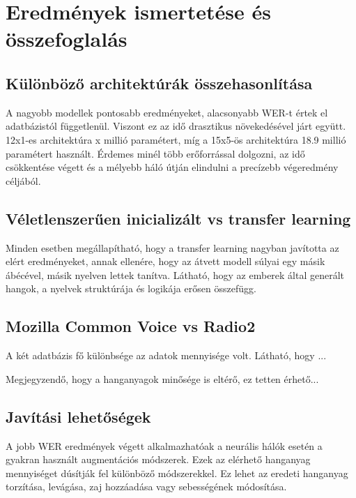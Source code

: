\chapter{Eredmények ismertetése és összefoglalás}

\section{Különböző architektúrák összehasonlítása}

A nagyobb modellek pontosabb eredményeket, alacsonyabb WER-t értek el adatbázistól függetlenül. Viszont ez az idő drasztikus növekedésével járt együtt. 12x1-es architektúra x millió paramétert, míg a 15x5-ös architektúra 18.9 millió paramétert használt. Érdemes minél több erőforrással dolgozni, az idő csökkentése végett és a mélyebb háló útján elindulni a precízebb végeredmény céljából.


\section{Véletlenszerűen inicializált vs transfer learning}

Minden esetben megállapítható, hogy a transfer learning nagyban javította az elért eredményeket, annak ellenére, hogy az átvett modell súlyai egy másik ábécével, másik nyelven lettek tanítva. Látható, hogy az emberek által generált hangok, a nyelvek struktúrája és logikája erősen összefügg.


\section{Mozilla Common Voice vs Radio2}

A két adatbázis fő különbsége az adatok mennyisége volt. Látható, hogy ...


Megjegyzendő, hogy a hanganyagok minősége is eltérő, ez tetten érhető...

\section{Javítási lehetőségek}

A jobb WER eredmények végett alkalmazhatóak a neurális hálók esetén a gyakran használt augmentációs módszerek. Ezek az elérhető hanganyag mennyiséget dúsítják fel különböző módszerekkel. Ez lehet az eredeti hanganyag torzítása, levágása, zaj hozzáadása vagy sebességének módosítása.

